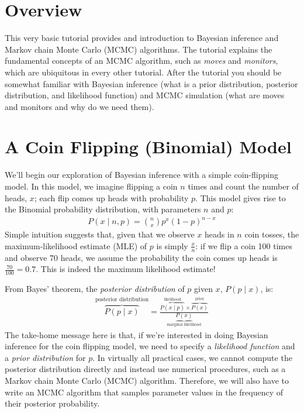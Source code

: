 \section{Overview}

This very basic tutorial provides and introduction to Bayesian inference and Markov chain Monte Carlo (MCMC) algorithms.
The tutorial explains the fundamental concepts of an MCMC algorithm, such as \emph{moves} and \emph{monitors}, which are ubiquitous in every other tutorial.
After the tutorial you should be somewhat familiar with Bayesian inference (\EG what is a prior distribution, posterior distribution, and likelihood function) and MCMC simulation (\EG what are moves and monitors and why do we need them).

\section{A Coin Flipping (Binomial) Model}

We'll begin our exploration of Bayesian inference with a simple coin-flipping model.
In this model, we imagine flipping a coin $n$ times and count the number of heads, $x$; each flip comes up heads with probability $p$.
This model gives rise to the Binomial probability distribution, with parameters $n$ and $p$:
\begin{align*}
P(x \mid n,p) = {n \choose x}p^x(1-p)^{n-x}
\end{align*}
Simple intuition suggests that, given that we observe $x$ heads in $n$ coin tosses, the maximum-likelihood estimate (MLE) of $p$ is simply $\frac{x}{n}$: if we flip a coin 100 times and observe 70 heads, we assume the probability the coin comes up heads is $\frac{70}{100} = 0.7$.
This is indeed the maximum likelihood estimate!

From Bayes' theorem, the \emph{posterior distribution} of $p$ given $x$, $P(p \mid x)$, is:
\begin{align*}
\overbrace{P(p \mid x)}^{\text{posterior distribution}} = \frac{ \overbrace{P(x \mid p)}^{\text{likelihood}} \times \overbrace{P(x)}^{\text{prior}}}{\underbrace{P(x)}_{\text{marginal likelihood}}}
\end{align*}
The take-home message here is that, if we're interested in doing Bayesian inference for the coin flipping model, we need to specify a \emph{likelihood function} and a \emph{prior distribution} for $p$.
In virtually all practical cases, we cannot compute the posterior distribution directly and instead use numerical procedures, such as a Markov chain Monte Carlo (MCMC) algorithm.
Therefore, we will also have to write an MCMC algorithm that samples parameter values in the frequency of their posterior probability.

